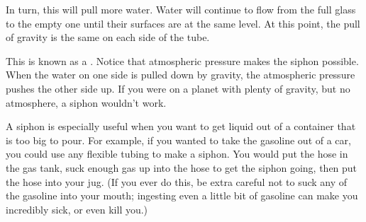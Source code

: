 In turn, this will pull more water. Water will continue to flow from the full glass to the empty one until their surfaces are at the same level.  At this point,  the pull of gravity is the same on each side of the tube.

This is known as a . Notice that atmospheric pressure makes the siphon possible. When the water on one side is pulled down by gravity,  the atmospheric pressure pushes the other side up.  If you were on a planet with plenty of gravity,  but no atmosphere,  a siphon wouldn't work.

A siphon is especially useful when you want to get liquid out of a container that is too big to pour. For 
example, if you wanted to take the gasoline out of a car,  you could use any flexible tubing to make a siphon.  You would put the hose in the gas tank,  suck enough gas up into the hose to get the siphon going,  then put the hose into your jug.  (If you ever do this,  be extra careful not to suck any of the gasoline into your mouth; ingesting even a little bit of gasoline can make you incredibly sick, or even kill you.)

